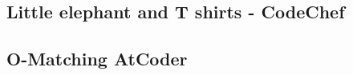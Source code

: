 \subsection{Little elephant and T shirts - CodeChef}
\raggedbottom
\hrulefill
\subsection{O-Matching AtCoder}
\raggedbottom
\hrulefill

